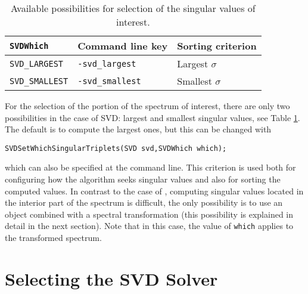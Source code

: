 \begin{table}
\centering
{\small \begin{tabular}{lll}
\texttt{SVDWhich}                  & Command line key                   & Sorting criterion \\\hline
\texttt{SVD\_LARGEST}   & \texttt{-svd\_largest}  & Largest $\sigma$ \\
\texttt{SVD\_SMALLEST}  & \texttt{-svd\_smallest} & Smallest $\sigma$ \\\hline
\end{tabular} }
\caption{\label{tab:whichsvd}Available possibilities for selection of the singular values of interest.}
\end{table}

	For the selection of the portion of the spectrum of interest, there are only two possibilities in the case of SVD: largest and smallest singular values, see Table \ref{tab:whichsvd}. The default is to compute the largest ones, but this can be changed with
	\begin{Verbatim}[fontsize=\small]
	SVDSetWhichSingularTriplets(SVD svd,SVDWhich which);
	\end{Verbatim}
which can also be specified at the command line. This criterion is used both for configuring how the algorithm seeks singular values and also for sorting the computed values. In contrast to the case of , computing singular values located in the interior part of the spectrum is difficult, the only possibility is to use an  object combined with a spectral transformation (this possibility is explained in detail in the next section). Note that in this case, the value of \Verb!which! applies to the transformed spectrum.

\section{Selecting the SVD Solver}

